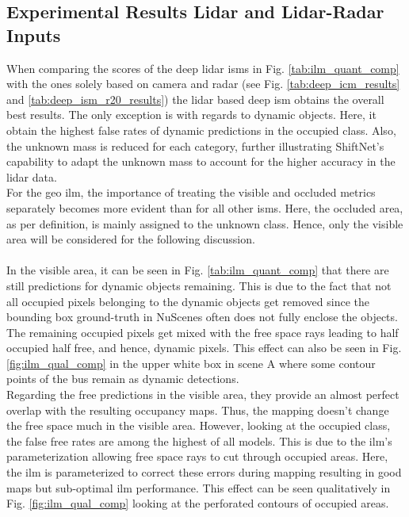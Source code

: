 \subsection{Experimental Results Lidar and Lidar-Radar Inputs}
\label{subsec:exp_lidar_fusion_in_deep_isms}
When comparing the scores of the deep lidar \gls{ism}s in Fig. \ref{tab:ilm_quant_comp} with the ones solely based on camera and radar (see Fig. \ref{tab:deep_icm_results} and \ref{tab:deep_ism_r20_results}) the lidar based deep \gls{ism} obtains the overall best results. The only exception is with regards to dynamic objects. Here, it obtain the highest false rates of dynamic predictions in the occupied class. Also, the unknown mass is reduced for each category, further illustrating ShiftNet's capability to adapt the unknown mass to account for the higher accuracy in the lidar data.\\
For the geo \gls{ilm}, the importance of treating the visible and occluded metrics separately becomes more evident than for all other \gls{ism}s. Here, the occluded area, as per definition, is mainly assigned to the unknown class. Hence, only the visible area will be considered for the following discussion.
\\\\
In the visible area, it can be seen in Fig. \ref{tab:ilm_quant_comp} that there are still predictions for dynamic objects remaining. This is due to the fact that not all occupied pixels belonging to the dynamic objects get removed since the bounding box ground-truth in NuScenes often does not fully enclose the objects. The remaining occupied pixels get mixed with the free space rays leading to half occupied half free, and hence, dynamic pixels. This effect can also be seen in Fig. \ref{fig:ilm_qual_comp} in the upper white box in scene A where some contour points of the bus remain as dynamic detections.\\
Regarding the free predictions in the visible area, they provide an almost perfect overlap with the resulting occupancy maps. Thus, the mapping doesn't change the free space much in the visible area. However, looking at the occupied class, the false free rates are among the highest of all models. This is due to the \gls{ilm}'s parameterization allowing free space rays to cut through occupied areas. Here, the \gls{ilm} is parameterized to correct these errors during mapping resulting in good maps but sub-optimal \gls{ilm} performance. This effect can be seen qualitatively in Fig. \ref{fig:ilm_qual_comp} looking at the perforated contours of occupied areas.
